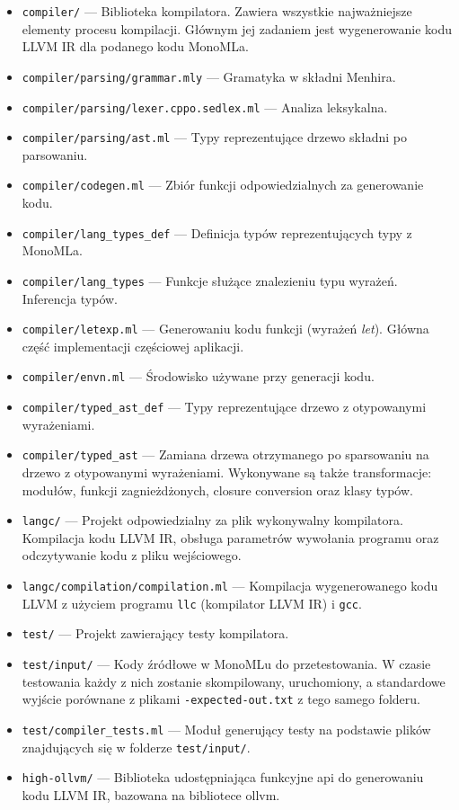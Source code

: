 \documentclass[declaration,shortabstract]{iithesis}
\begin{document}
\begin{itemize}
  \item \texttt{compiler/} --- Biblioteka kompilatora. Zawiera wszystkie 
  najważniejsze elementy procesu kompilacji. Głównym jej zadaniem jest 
  wygenerowanie kodu LLVM IR dla podanego kodu MonoMLa.
  \item \texttt{compiler/parsing/grammar.mly} --- Gramatyka w składni Menhira.
  \item \texttt{compiler/parsing/lexer.cppo.sedlex.ml} --- Analiza leksykalna.
  \item \texttt{compiler/parsing/ast.ml} --- Typy reprezentujące drzewo składni 
  po parsowaniu.
  \item \texttt{compiler/codegen.ml} --- Zbiór funkcji odpowiedzialnych za 
  generowanie kodu.
  \item \texttt{compiler/lang\_types\_def} --- Definicja typów reprezentujących 
  typy z MonoMLa.
  \item \texttt{compiler/lang\_types} --- Funkcje służące znalezieniu
  typu wyrażeń. Inferencja typów.
  \item \texttt{compiler/letexp.ml} --- Generowaniu kodu funkcji 
  (wyrażeń \textit{let}). 
  Główna część implementacji częściowej aplikacji.
  \item \texttt{compiler/envn.ml} --- Środowisko używane przy 
  generacji kodu.
  \item \texttt{compiler/typed\_ast\_def} --- Typy reprezentujące drzewo 
  z otypowanymi wyrażeniami.
  \item \texttt{compiler/typed\_ast} --- Zamiana drzewa otrzymanego po 
  sparsowaniu na drzewo z otypowanymi wyrażeniami. Wykonywane są także 
  transformacje: modułów, funkcji zagnieżdżonych, closure conversion
  oraz klasy typów.
  \item \texttt{langc/} --- Projekt odpowiedzialny za plik wykonywalny 
  kompilatora. Kompilacja kodu LLVM IR, obsługa parametrów wywołania programu
  oraz odczytywanie kodu z pliku wejściowego.
  \item \texttt{langc/compilation/compilation.ml} --- Kompilacja wygenerowanego 
  kodu LLVM z użyciem programu \texttt{llc} (kompilator LLVM IR) i 
  \texttt{gcc}.
  \item \texttt{test/} --- Projekt zawierający testy kompilatora.
  \item \texttt{test/input/} --- Kody źródłowe w MonoMLu do przetestowania. W czasie 
  testowania każdy z nich zostanie skompilowany, uruchomiony, a standardowe
  wyjście porównane z plikami \texttt{-expected-out.txt} z tego samego folderu.
  \item \texttt{test/compiler\_tests.ml} --- Moduł generujący testy na podstawie 
  plików znajdujących się w folderze \texttt{test/input/}.
  \item \texttt{high-ollvm/} --- Biblioteka udostępniająca funkcyjne api do 
  generowaniu kodu LLVM IR, bazowana na bibliotece ollvm\cite{ollvm}.

\end{itemize}
\end{document}

